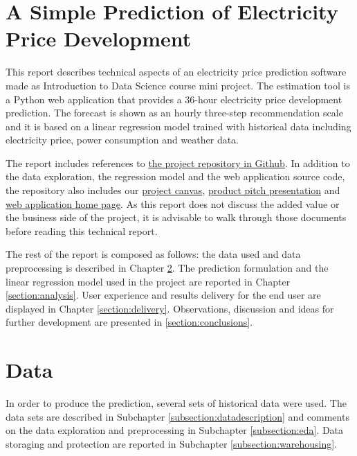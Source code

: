 \documentclass{article}
\begin{document}


\tableofcontents

\vspace{30.0 cm}

\section{A Simple Prediction of Electricity Price Development}
\label{section:introduction}

This report describes technical aspects of an electricity price prediction software made as Introduction to Data Science course mini project. The estimation tool is a Python web application that provides a 36-hour electricity price development prediction. The forecast is shown as an hourly three-step recommendation scale and it is based on a linear regression model trained with historical data including electricity price, power consumption and weather data.

The report includes references to \href{https://github.com/IDS-mini/electricity}{the project repository in Github}. In addition to the data exploration, the regression model and the web application source code, the repository also includes our \href{https://github.com/IDS-mini/electricity/blob/main/marketing/Mini-Project-Canvas-Hedlund-Korpi-Ranta.pdf}{project canvas}, \href{https://github.com/IDS-mini/electricity/blob/main/marketing/presentation.pptx}{product pitch presentation} and \href{https://github.com/IDS-mini/electricity/blob/main/src/app/templates/index.html}{web application home page}. As this report does not discuss the added value or the business side of the project, it is advisable to walk through those documents before reading this technical report.

The rest of the report is composed as follows: the data used and data preprocessing is described in Chapter \ref{section:data}. The prediction formulation and the linear regression model used in the project are reported in Chapter \ref{section:analysis}. User experience and results delivery for the end user are displayed in Chapter \ref{section:delivery}. Observations, discussion and ideas for further development are presented in \ref{section:conclusions}.

\section{Data}
\label{section:data}

In order to produce the prediction, several sets of historical data were used. The data sets are described in Subchapter \ref{subsection:datadescription} and comments on the data exploration and preprocessing in Subchapter \ref{subsection:eda}. Data storaging and protection are reported in Subchapter \ref{subsection:warehousing}.
\end{document}
